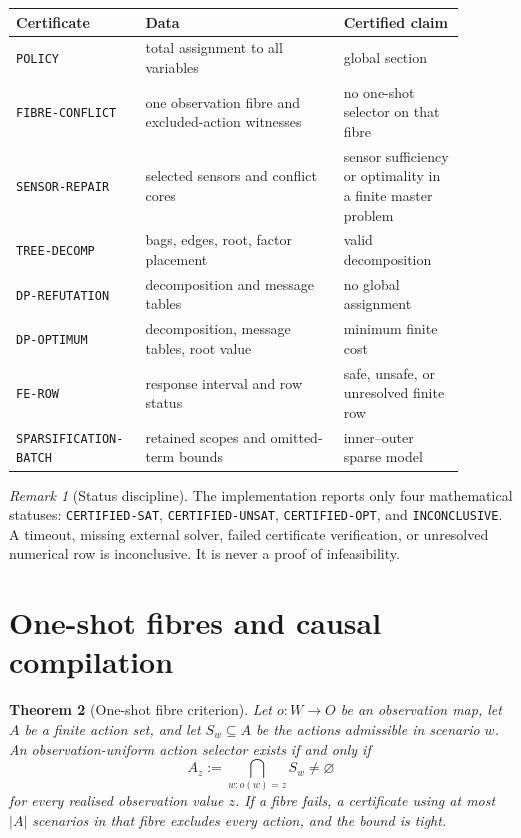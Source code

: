 \documentclass[11pt]{article}
\theoremstyle{plain}
\newtheorem{theorem}{Theorem}[section]
\theoremstyle{definition}
\theoremstyle{remark}
\newtheorem{remark}[theorem]{Remark}
\begin{document}
\begin{center}
\begin{tabular}{@{}p{0.23\linewidth}p{0.41\linewidth}p{0.25\linewidth}@{}}
\toprule
Certificate & Data & Certified claim\\
\midrule
\texttt{POLICY} & total assignment to all variables & global section\\
\texttt{FIBRE-CONFLICT} & one observation fibre and excluded-action witnesses & no one-shot selector on that fibre\\
\texttt{SENSOR-REPAIR} & selected sensors and conflict cores & sensor sufficiency or optimality in a finite master problem\\
\texttt{TREE-DECOMP} & bags, edges, root, factor placement & valid decomposition\\
\texttt{DP-REFUTATION} & decomposition and message tables & no global assignment\\
\texttt{DP-OPTIMUM} & decomposition, message tables, root value & minimum finite cost\\
\texttt{FE-ROW} & response interval and row status & safe, unsafe, or unresolved finite row\\
\texttt{SPARSIFICATION-BATCH} & retained scopes and omitted-term bounds & inner--outer sparse model\\
\bottomrule
\end{tabular}
\end{center}

\begin{remark}[Status discipline]
The implementation reports only four mathematical statuses:
\texttt{CERTIFIED-SAT}, \texttt{CERTIFIED-UNSAT}, \texttt{CERTIFIED-OPT}, and
\texttt{INCONCLUSIVE}.  A timeout, missing external solver, failed certificate
verification, or unresolved numerical row is inconclusive.  It is never a proof
of infeasibility.
\end{remark}

\section{One-shot fibres and causal compilation}
\label{sec:fibres-compilation}

\begin{theorem}[One-shot fibre criterion]
Let \(o:W\to O\) be an observation map, let \(A\) be a finite action set, and
let \(S_w\subseteq A\) be the actions admissible in scenario \(w\).  An
observation-uniform action selector exists if and only if
\[
  A_z:=\bigcap_{w:o(w)=z}S_w\ne\varnothing
\]
for every realised observation value \(z\).  If a fibre fails, a certificate
using at most \(|A|\) scenarios in that fibre excludes every action, and the
bound is tight.
\end{theorem}
\end{document}

